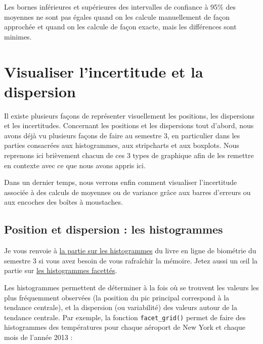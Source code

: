 \documentclass[
  a4paper,
  DIV=11,
  numbers=noendperiod,
  oneside]{scrreprt}
\begin{document}
Les bornes inférieures et supérieures des intervalles de confiance à
95\% des moyennes ne sont pas égales quand on les calcule manuellement
de façon approchée et quand on les calcule de façon exacte, mais les
différences sont minimes.

\hypertarget{visualiser-lincertitude-et-la-dispersion}{%
\section{Visualiser l'incertitude et la
dispersion}\label{visualiser-lincertitude-et-la-dispersion}}

Il existe plusieurs façons de représenter visuellement les positions,
les dispersions et les incertitudes. Concernant les positions et les
dispersions tout d'abord, nous avons déjà vu plusieurs façons de faire
au semestre 3, en particulier dans les parties consacrées aux
histogrammes, aux stripcharts et aux boxplots. Nous reprenons ici
brièvement chacun de ces 3 types de graphique afin de les remettre en
contexte avec ce que nous avons appris ici.

Dans un dernier temps, nous verrons enfin comment visualiser
l'incertitude associée à des calculs de moyennes ou de variance grâce
aux barres d'erreurs ou aux encoches des boîtes à moustaches.

\hypertarget{position-et-dispersion-les-histogrammes}{%
\subsection{Position et dispersion : les
histogrammes}\label{position-et-dispersion-les-histogrammes}}

Je vous renvoie à
\href{https://besibo.github.io/BiometrieS3/03-visualization.html\#les-histogrammes}{la
partie sur les histogrammes} du livre en ligne de biométrie du semestre
3 si vous avez besoin de vous rafraîchir la mémoire. Jetez aussi un œil
la partie sur
\href{https://besibo.github.io/BiometrieS3/03-visualization.html\#sec-factorhisto}{les
histogrammes facettés}.

Les histogrammes permettent de déterminer à la fois où se trouvent les
valeurs les plus fréquemment observées (la position du pic principal
correspond à la tendance centrale), et la dispersion (ou variabilité)
des valeurs autour de la tendance centrale. Par exemple, la fonction
\texttt{facet\_grid()} permet de faire des histogrammes des températures
pour chaque aéroport de New York et chaque mois de l'année 2013 :
\end{document}

